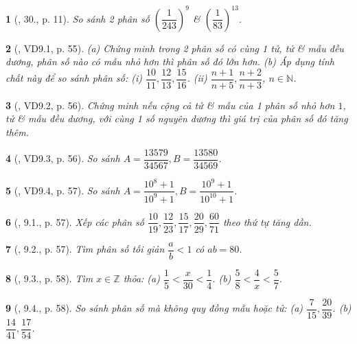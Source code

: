 \documentclass{article}
\newtheorem{baitoan}{}
\begin{document}
\begin{baitoan}[\cite{Binh_Toan_6_tap_2}, 30., p. 11]
	So sánh 2 phân số $\left(\dfrac{1}{243}\right)^9$ \& $\left(\dfrac{1}{83}\right)^{13}$.
\end{baitoan}

\begin{baitoan}[\cite{TLCT_THCS_Toan_6_so_hoc}, VD9.1, p. 55]
	(a) Chứng minh trong 2 phân số có cùng 1 tử, tử \& mẫu đều dương, phân số nào có mẫu nhỏ hơn thì phân số đó lớn hơn. (b) Áp dụng tính chất này để so sánh phân số: (i) $\dfrac{10}{11},\dfrac{12}{13},\dfrac{15}{16}$. (ii) $\dfrac{n + 1}{n + 5},\dfrac{n + 2}{n + 3}$, $n\in\mathbb{N}$.
\end{baitoan}

\begin{baitoan}[\cite{TLCT_THCS_Toan_6_so_hoc}, VD9.2, p. 56]
	Chứng minh nếu cộng cả tử \& mẫu của 1 phân số nhỏ hơn $1$, tử \& mẫu đều dương, với cùng 1 số nguyên dương thì giá trị của phân số đó tăng thêm.
\end{baitoan}

\begin{baitoan}[\cite{TLCT_THCS_Toan_6_so_hoc}, VD9.3, p. 56]
	So sánh $A = \dfrac{13579}{34567},B = \dfrac{13580}{34569}$.
\end{baitoan}

\begin{baitoan}[\cite{TLCT_THCS_Toan_6_so_hoc}, VD9.4, p. 57]
	So sánh $A = \dfrac{10^8 + 1}{10^9 + 1},B = \dfrac{10^9 + 1}{10^{10} + 1}$.
\end{baitoan}

\begin{baitoan}[\cite{TLCT_THCS_Toan_6_so_hoc}, 9.1., p. 57]
	Xếp các phân số $\dfrac{10}{19},\dfrac{12}{23},\dfrac{15}{17},\dfrac{20}{29},\dfrac{60}{71}$ theo thứ tự tăng dần.
\end{baitoan}

\begin{baitoan}[\cite{TLCT_THCS_Toan_6_so_hoc}, 9.2., p. 57]
	Tìm phân số tối giản $\dfrac{a}{b} < 1$ có $ab = 80$.
\end{baitoan}

\begin{baitoan}[\cite{TLCT_THCS_Toan_6_so_hoc}, 9.3., p. 58]
	Tìm $x\in\mathbb{Z}$ thỏa: (a) $\dfrac{1}{5} < \dfrac{x}{30} < \dfrac{1}{4}$. (b) $\dfrac{5}{8} < \dfrac{4}{x} < \dfrac{5}{7}$.
\end{baitoan}

\begin{baitoan}[\cite{TLCT_THCS_Toan_6_so_hoc}, 9.4., p. 58]
	So sánh phân số mà không quy đồng mẫu hoặc tử: (a) $\dfrac{7}{15},\dfrac{20}{39}$. (b) $\dfrac{14}{41},\dfrac{17}{54}$.
\end{baitoan}
\end{document}
